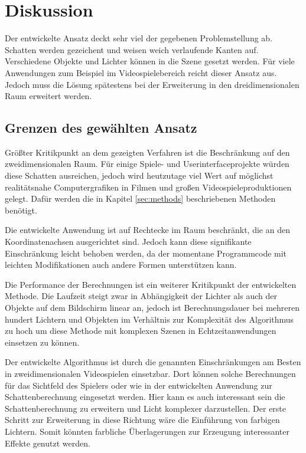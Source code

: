 \section{Diskussion}

Der entwickelte Ansatz deckt sehr viel der gegebenen Problemstellung ab. Schatten werden gezeichent
und weisen weich verlaufende Kanten auf. Verschiedene Objekte und Lichter können in die Szene gesetzt
werden. Für viele Anwendungen zum Beispiel im Videospielebereich reicht dieser Ansatz aus. Jedoch
muss die Lösung spätestens bei der Erweiterung in den dreidimensionalen Raum erweitert werden.

\subsection{Grenzen des gewählten Ansatz}

Größter Kritikpunkt an dem gezeigten Verfahren ist die Beschränkung auf den zweidimensionalen Raum.
Für einige Spiele- und Userinterfaceprojekte würden diese Schatten ausreichen, jedoch wird heutzutage
viel Wert auf möglichst realitätsnahe Computergrafiken in Filmen und großen Videospieleproduktionen
gelegt. Dafür werden die in Kapitel \ref{sec:methods} beschriebenen Methoden benötigt.

Die entwickelte Anwendung ist auf Rechtecke im Raum beschränkt, die an den Koordinatenachsen
ausgerichtet sind. Jedoch kann diese signifikante Einschränkung leicht behoben werden, da der
momentane Programmcode mit leichten Modifikationen auch andere Formen unterstützen kann.

Die Performance der Berechnungen ist ein weiterer Kritikpunkt der entwickelten Methode. Die Laufzeit
steigt zwar in Abhängigkeit der Lichter als auch der Objekte auf dem Bildschirm linear an, jedoch
ist Berechnungsdauer bei mehreren hundert Lichtern und Objekten im Verhältnis zur Komplexität des
Algorithmus zu hoch um diese Methode mit komplexen Szenen in Echtzeitanwendungen einsetzen zu können.

Der entwickelte Algorithmus ist durch die genannten Einschränkungen am Besten in zweidimensionalen
Videospielen einsetzbar. Dort können solche Berechnungen für das Sichtfeld des Spielers oder wie in
der entwickelten Anwendung zur Schattenberechnung eingesetzt werden. Hier kann es auch interessant
sein die Schattenberechnung zu erweitern und Licht komplexer darzustellen. Der erste Schritt zur
Erweiterung in diese Richtung wäre die Einführung von farbigen Lichtern. Somit könnten farbliche
Überlagerungen zur Erzeugung interessanter Effekte genutzt werden.

